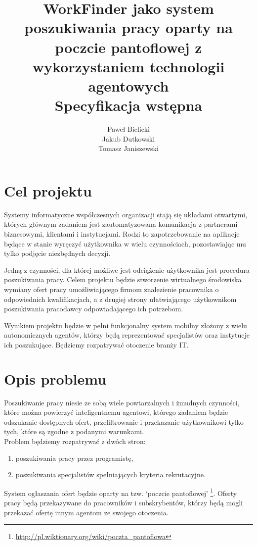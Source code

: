 \documentclass[11pt,a4paper]{article}
\author{
	Paweł Bielicki\\
	Jakub Dutkowski\\
	Tomasz Janiszewski
}
\title{
	\huge{WorkFinder jako system poszukiwania pracy oparty na poczcie pantoflowej z wykorzystaniem technologii agentowych}\\
	\LARGE{Specyfikacja wstępna}
 }
\begin{document}
\maketitle

\listoftodos
\newpage

\section{Cel projektu}
Systemy informatyczne współczesnych organizacji stają się układami otwartymi, których głównym zadaniem jest zautomatyzowana komunikacja z partnerami biznesowymi, klientami i instytucjami. Rodzi to zapotrzebowanie na aplikacje będące w stanie wyręczyć użytkownika w wielu czynnościach, pozostawiając mu tylko podjęcie niezbędnych decyzji.

Jedną z czynności, dla której możliwe jest odciążenie użytkownika jest procedura poszukiwania pracy. Celem projektu będzie stworzenie wirtualnego środowiska wymiany ofert pracy umożliwiającego firmom znalezienie pracownika o odpowiednich kwalifikacjach, a z drugiej strony ułatwiającego użytkownikom poszukiwania pracodawcy odpowiadającego ich potrzebom.

Wynikiem projektu będzie w pełni funkcjonalny system mobilny złożony z wielu autonomicznych agentów, którzy będą reprezentować specjalistów oraz instytucje ich poszukujące. Będziemy rozpatrywać otoczenie branży IT.

\section{Opis problemu}

Poszukiwanie pracy niesie ze sobą wiele powtarzalnych i żmudnych czynności, które można powierzyć inteligentnemu agentowi, którego zadaniem będzie odszukanie dostępnych ofert, przefiltrowanie i przekazanie użytkownikowi tylko tych, które są zgodne z podanymi warunkami.
\\
Problem będziemy rozpatrywać z dwóch stron:
\begin{enumerate}
	\item poszukiwania pracy przez programistę,
	\item poszukiwania specjalistów spełniających kryteria rekrutacyjne.
\end{enumerate}

System ogłaszania ofert będzie oparty na tzw. `poczcie pantoflowej' \footnote{\url{http://pl.wiktionary.org/wiki/poczta_pantoflowa}}. Oferty pracy będą przekazywane do pracowników i subskrybentów, którzy będą mogli przekazać ofertę innym agentom ze swojego otoczenia.
\end{document}
